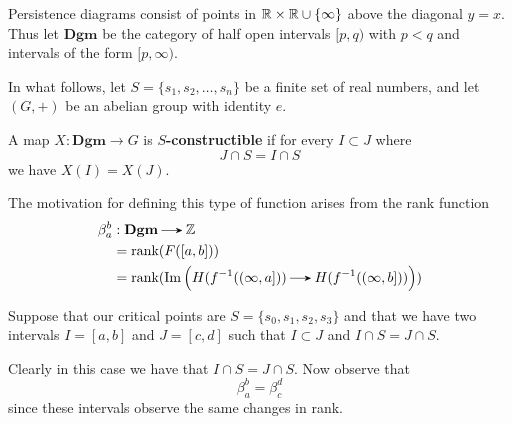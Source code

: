 Persistence diagrams consist of points in $\mathbb{R} \times \mathbb{R} \cup\{\infty\}$ 
above the diagonal $y = x$. Thus let $\textbf{Dgm}$ be the category of half
open intervals $[p, q)$ with $p < q$ and intervals of the form $[p, \infty)$. 

In what follows, let $S = \{s_1, s_2, \dots, s_n\}$ be a finite set of real numbers, and 
let $(G, +)$ be an abelian group with identity $e$.

\begin{definition}
    A 
    map $X: \textbf{Dgm} \to G$ is \textbf{$S$-constructible} if for every $I \subset J$ 
    where 
    \[
        J \cap S = I \cap S    
    \]
    we have $X(I) = X(J)$. 
\end{definition}
The motivation for defining this type of function arises from the 
rank function
\begin{align*}
    \beta_a^b&:\textbf{Dgm} \to \mathbb{Z}\\
    &= \text{rank}(F([a, b]))\\
    &= \text{rank}(\im\Big( H(f^{-1}((\infty, a ])) \to H(f^{-1}((\infty, b])) \Big))
\end{align*}

Suppose that our critical points are $S = \{s_0, s_1, s_2, s_3\}$
and that we have two intervals $I = [a, b]$ 
and $J = [c, d]$ such that $I \subset J$ and $I \cap S = J \cap S$. 

\begin{center}
\end{center}

Clearly in this case we have that $I \cap S = J \cap S$. Now observe that 
\[
    \beta_a^b = \beta_c^d   
\]
since these intervals observe the same changes in rank.

